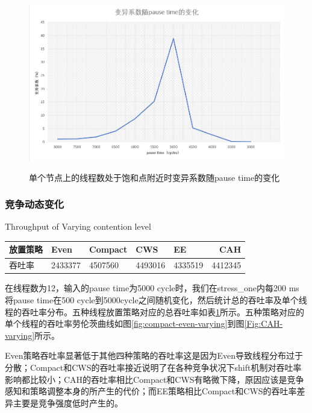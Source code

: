 \begin{figure}[t]
	\centering
	\includegraphics[width=5.6in]{figure/CV-pause.PNG}
	\caption{单个节点上的线程数处于饱和点附近时变异系数随pause time的变化}{}
	\label{Fig:CV-pause}
\end{figure}

\subsubsection{竞争动态变化}
\begin{table}[!hpb]
  \centering
    {Throughput of Varying contention level}
  \label{tab:thrpt-varying}
  \begin{tabular}{@{}lllllr@{}} \toprule
    放置策略 & Even & Compact & CWS & EE & CAH\\ \midrule
    吞吐率	&2433377	&4507560	& 4493016	& 4335519	& 4412345 \\
  \end{tabular}
\end{table}
在线程数为12，输入的pause time为5000 cycle时，我们在stress\_one内每200 ms 将pause time在500 cycle到5000cycle之间随机变化，然后统计总的吞吐率及单个线程的吞吐率分布。五种线程放置策略对应的总吞吐率如表\ref{tab:thrpt-varying}所示。五种策略对应的单个线程的吞吐率劳伦茨曲线如图\ref{fig:compact-even-varying}到图\ref{Fig:CAH-varying}所示。

Even策略吞吐率显著低于其他四种策略的吞吐率这是因为Even导致线程分布过于分散；Compact和CWS的吞吐率接近说明了在各种竞争状况下shift机制对吞吐率影响都比较小；CAH的吞吐率相比Compact和CWS有略微下降，原因应该是竞争感知和策略调整本身的所产生的代价；而EE策略相比Compact和CWS的吞吐率差异主要是竞争强度低时产生的。

